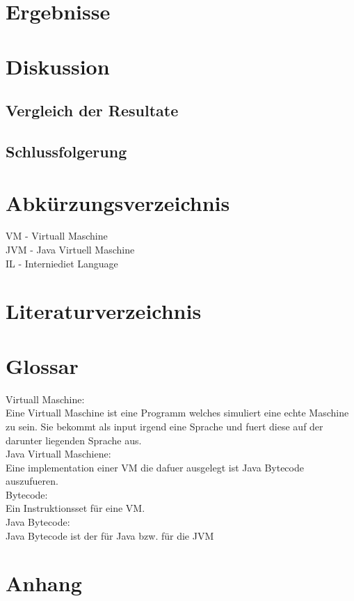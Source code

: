 \documentclass{fancydocument}
\begin{document}
\section{Ergebnisse}
\section{Diskussion}
\subsection{Vergleich der Resultate}

\subsection{Schlussfolgerung}


\section{Abk\"urzungsverzeichnis}

VM  - Virtuall Maschine
\\
JVM - Java Virtuell Maschine
\\
IL - Interniediet Language

\section{Literaturverzeichnis}



\section{Glossar}

Virtuall Maschine:\\ Eine Virtuall Maschine ist eine Programm welches simuliert eine echte
Maschine zu sein. Sie bekommt als input irgend eine Sprache und fuert
diese auf der darunter liegenden Sprache aus.
\\
Java Virtuall Maschiene: \\ Eine implementation einer VM die dafuer ausgelegt ist Java Bytecode auszufueren.\\

Bytecode: \\Ein Instruktionsset f\"ur eine VM.\\
Java Bytecode:\\ Java Bytecode ist der f\"ur Java bzw. f\"ur die JVM



\section{Anhang}
\end{document}

